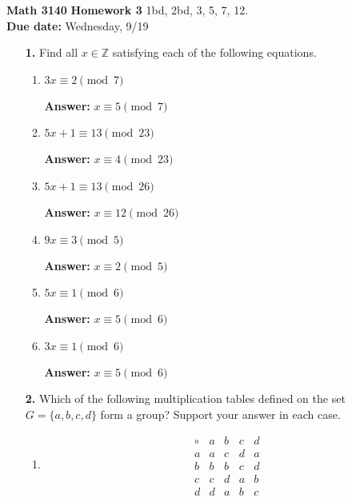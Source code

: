 \documentclass[12pt,reqno]{amsart}
\begin{document}
\thispagestyle{empty}

\noindent \textbf{Math 3140} \hfill {\bf Homework 3} 
\vskip1cm
 1bd, 2bd, 3, 5, 7, 12.  
\\
{\bf Due date:} Wednesday, 9/19

\medskip

\begin{enumerate}

\item[{\bf 1.}]
Find all $x \in {\mathbb Z}$ satisfying each of the following equations.
\begin{multicols}{2}
\begin{enumerate}

\item 
$3x \equiv 2 \pmod{ 7}$

\textbf{Answer:} $x \equiv 5 \pmod{7}$

\item
$5x + 1 \equiv 13 \pmod{ 23}$

\textbf{Answer:} $x \equiv 4 \pmod{23}$

\item
$5x + 1 \equiv 13 \pmod{ 26}$

\textbf{Answer:} $x \equiv 12 \pmod{26}$

\item
$9x \equiv 3 \pmod{ 5}$

\textbf{Answer:} $x \equiv 2 \pmod{5}$

\item
$5x \equiv 1 \pmod{ 6}$

\textbf{Answer:} $x \equiv 5 \pmod{6}$

\item
$3x \equiv 1 \pmod{ 6}$

\textbf{Answer:} $x \equiv 5 \pmod{6}$

\end{enumerate}
\end{multicols}

\medskip
\item[{\bf 2.}]
Which of the following multiplication tables defined on the set $G =
\{ a, b, c, d \}$ form a group? Support your answer in each case. 
\begin{multicols}{2}
\begin{enumerate}

\item
\[
\begin{array}{c|cccc}
\circ & a & b & c & d \\
\hline
a & a & c & d & a \\
b & b & b & c & d \\
c & c & d & a & b \\
d & d & a & b & c
\end{array}
\]


\end{enumerate}
\end{multicols}
\end{enumerate}
\end{document}
